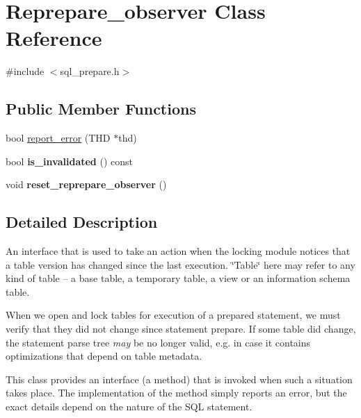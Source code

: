 \hypertarget{classReprepare__observer}{}\section{Reprepare\+\_\+observer Class Reference}
\label{classReprepare__observer}


{\ttfamily \#include $<$sql\+\_\+prepare.\+h$>$}

\subsection*{Public Member Functions}
\begin{DoxyCompactItemize}
\item 
bool \mbox{\hyperlink{classReprepare__observer_a46318688ac06952559ad6f60a5a1cd53}{report\+\_\+error}} (T\+HD $\ast$thd)
\item 
\mbox{\label{classReprepare__observer_a26aac757fb29b15628482fc212c9def5}} 
bool {\bfseries is\+\_\+invalidated} () const
\item 
\mbox{\label{classReprepare__observer_a522187c629e08a9abae8110a282149d1}} 
void {\bfseries reset\+\_\+reprepare\+\_\+observer} ()
\end{DoxyCompactItemize}


\subsection{Detailed Description}
An interface that is used to take an action when the locking module notices that a table version has changed since the last execution. \char`\"{}\+Table\char`\"{} here may refer to any kind of table -- a base table, a temporary table, a view or an information schema table.

When we open and lock tables for execution of a prepared statement, we must verify that they did not change since statement prepare. If some table did change, the statement parse tree {\itshape may} be no longer valid, e.\+g. in case it contains optimizations that depend on table metadata.

This class provides an interface (a method) that is invoked when such a situation takes place. The implementation of the method simply reports an error, but the exact details depend on the nature of the S\+QL statement.

